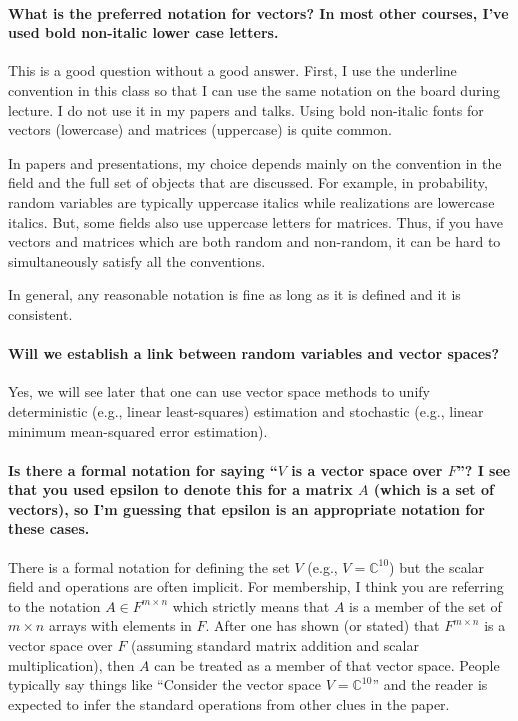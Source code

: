 \documentclass[10pt,english]{article}
\begin{document}
\paragraph{What is the preferred notation for vectors? In most other courses, I've used bold non-italic lower case letters.}
This is a good question without a good answer.
First, I use the underline convention in this class so that I can use the same notation on the board during lecture.
I do not use it in my papers and talks.
Using bold non-italic fonts for vectors (lowercase) and matrices (uppercase) is quite common.

In papers and presentations, my choice depends mainly on the convention in the field and the full set of objects that are discussed.
For example, in probability, random variables are typically uppercase italics while realizations are lowercase italics.
But, some fields also use uppercase letters for matrices.
Thus, if you have vectors and matrices which are both random and non-random, it can be hard to simultaneously satisfy all the conventions.

In general, any reasonable notation is fine as long as it is defined and it is consistent.

\paragraph{Will we establish a link between random variables and vector spaces?}

Yes, we will see later that one can use vector space methods to unify deterministic (e.g., linear least-squares) estimation and stochastic (e.g., linear minimum mean-squared error estimation).

\paragraph{Is there a formal notation for saying ``$V$ is a vector space over $F$''? I see that you used epsilon to denote this for a matrix $A$ (which is a set of vectors), so I'm guessing that epsilon is an appropriate notation for these cases.}

There is a formal notation for defining the set $V$ (e.g., $V=\mathbb{C}^{10}$) but the scalar field and operations are often implicit.
For membership, I think you are referring to the notation $A \in F^{m\times n}$ which strictly means that $A$ is a member of the set of $m\times n$ arrays with elements in $F$.
After one has shown (or stated) that $F^{m\times n}$ is a vector space over $F$ (assuming standard matrix addition and scalar multiplication), then $A$ can be treated as a member of that vector space.
People typically say things like ``Consider the vector space $V=\mathbb{C}^{10}$'' and the reader is expected to infer the standard operations from other clues in the paper.
\end{document}
